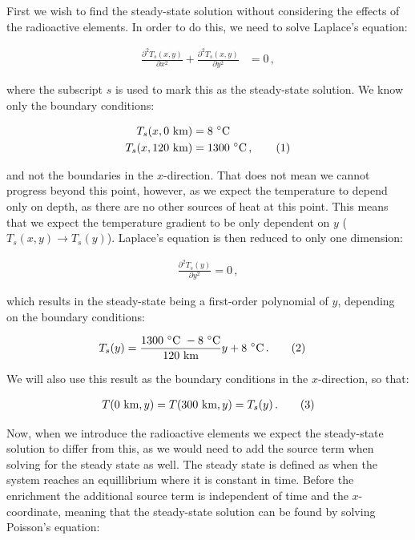 \documentclass[reprint,english,notitlepage]{revtex4-1}  %
\newcommand\numberthis{\addtocounter{equation}{1}\tag{\theequation}}
\begin{document}
First we wish to find the steady-state solution without considering the effects of the radioactive elements. In order to do this, we need to solve Laplace's equation:

\begin{align*}
\frac{\partial^2 T_s(x,y)}{\partial x^2} + \frac{\partial^2 T_s(x,y)}{\partial y^2} &= 0 \, ,
\end{align*}

where the subscript $s$ is used to mark this as the steady-state solution. We know only the boundary conditions:

\begin{align*}
T_s(x,0 \text{ km}) &= 8 \text{ } ^\circ\text{C} \\
T_s(x,120 \text{ km}) &= 1300 \text{ } ^\circ\text{C} \, , \numberthis \label{eq:heat_boundary_conditions_y}
\end{align*} 

and not the boundaries in the $x$-direction. That does not mean we cannot progress beyond this point, however, as we expect the temperature to depend only on depth, as there are no other sources of heat at this point. This means that we expect the temperature gradient to be only dependent on $y$ ($T_s(x,y) \to T_s(y)$). Laplace's equation is then reduced to only one dimension:

\begin{align*}
\frac{\partial^2 T_s(y)}{\partial y^2} = 0 \, ,
\end{align*}  

which results in the steady-state being a first-order polynomial of $y$, depending on the boundary conditions:

\begin{align*}
T_s(y) &= \frac{1300\text{ $^\circ$C }-8 \text{ $^\circ$C} }{120 \text{ km} } y + 8 \text{ $^\circ$C}\, . \numberthis \label{eq:steady_state_heat} 
\end{align*} 

We will also use this result as the boundary conditions in the $x$-direction, so that:

\begin{align*}
T(0 \text{ km},y) = T(300 \text{ km},y) = T_s(y) \, . \numberthis \label{eq:heat_boundary_conditions_x}
\end{align*}


Now, when we introduce the radioactive elements we expect the steady-state solution to differ from this, as we would need to add the source term when solving for the steady state as well. The steady state is defined as when the system reaches an equillibrium where it is constant in time. Before the enrichment the additional source term is independent of time and the $x$-coordinate, meaning that the steady-state solution can be found by solving Poisson's equation:
\end{document}
